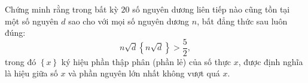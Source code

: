 \ifshowproblem
\begin{problem}\label{example:BMO-2015-P4}
    Chứng minh rằng trong bất kỳ \( 20 \) số nguyên dương liên tiếp nào cũng tồn tại một số nguyên \( d \)
    sao cho với mọi số nguyên dương \( n \), bất đẳng thức sau luôn đúng:
    \[
        n \sqrt{d} \left\{ n \sqrt{d} \right\} > \frac{5}{2},
    \]
    trong đó \( \left\{ x \right\} \) ký hiệu phần thập phân (phần lẻ) của số thực \( x \),
    được định nghĩa là hiệu giữa số \( x \) và phần nguyên lớn nhất không vượt quá \( x \).    
\end{problem}
\fi

\footnotemark
{}
\fi